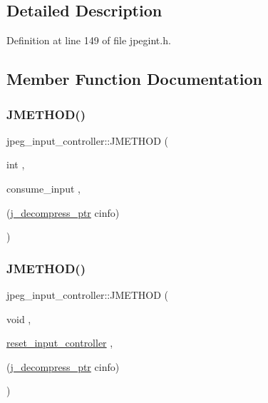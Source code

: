 \subsection{Detailed Description}


Definition at line 149 of file jpegint.\+h.



\subsection{Member Function Documentation}
\mbox{\label{structjpeg__input__controller_af742c796479db5dd8b3275307d76a103}} 
\subsubsection{\texorpdfstring{JMETHOD()}{JMETHOD()}\hspace{0.1cm}{\footnotesize\ttfamily [1/4]}}
{\footnotesize\ttfamily jpeg\+\_\+input\+\_\+controller\+::\+J\+M\+E\+T\+H\+OD (\begin{DoxyParamCaption}\item[{int}]{,  }\item[{consume\+\_\+input}]{,  }\item[{(\mbox{\hyperlink{jpeglib_8h_a00c7d78af44bd26a901c791ccfc1e178}{j\+\_\+decompress\+\_\+ptr}} cinfo)}]{ }\end{DoxyParamCaption})}

\mbox{\label{structjpeg__input__controller_aa2720adb6f991abedb2e8c03804cac4f}} 
\subsubsection{\texorpdfstring{JMETHOD()}{JMETHOD()}\hspace{0.1cm}{\footnotesize\ttfamily [2/4]}}
{\footnotesize\ttfamily jpeg\+\_\+input\+\_\+controller\+::\+J\+M\+E\+T\+H\+OD (\begin{DoxyParamCaption}\item[{void}]{,  }\item[{\mbox{\hyperlink{jdinput_8c_a93f58ee9099d00fef5d7e3891aa9e54f}{reset\+\_\+input\+\_\+controller}}}]{,  }\item[{(\mbox{\hyperlink{jpeglib_8h_a00c7d78af44bd26a901c791ccfc1e178}{j\+\_\+decompress\+\_\+ptr}} cinfo)}]{ }\end{DoxyParamCaption})}

